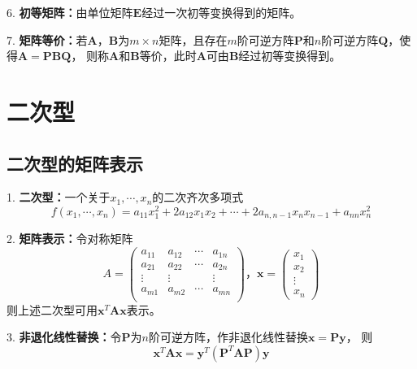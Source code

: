 6. \textbf{初等矩阵：}由单位矩阵$\boldsymbol{E}$经过一次初等变换得到的矩阵。

7. \textbf{矩阵等价：}若$\boldsymbol{A}$，$\boldsymbol{B}$为$m\times n$矩阵，且存在$m$阶可逆方阵$\boldsymbol{P}$和$n$阶可逆方阵$\boldsymbol{Q}$，使得$\boldsymbol{A}=\boldsymbol{P}\boldsymbol{B}\boldsymbol{Q}$，
则称$\boldsymbol{A}$和$\boldsymbol{B}$等价，此时$\boldsymbol{A}$可由$\boldsymbol{B}$经过初等变换得到。

\section{二次型}

\subsection{二次型的矩阵表示}

1. \textbf{二次型：}一个关于$x_1,\cdots,x_n$的二次齐次多项式
\begin{equation*}
    f(x_1,\cdots,x_n)=a_{11}x_1^2+2a_{12}x_1x_2+\cdots+2a_{n,n-1}x_nx_{n-1}+a_{nn}x_n^2
\end{equation*}

2. \textbf{矩阵表示：}令对称矩阵\begin{equation*}
    A=\begin{pmatrix}
        a_{11}&a_{12}&\cdots&a_{1n}\\
        a_{21}&a_{22}&\cdots&a_{2n}\\
        \vdots&\vdots&&\vdots\\
        a_{m1}&a_{m2}&\cdots&a_{mn}\\
    \end{pmatrix}\text{，}\boldsymbol{x}=\begin{pmatrix}
        x_1\\
        x_2\\
        \vdots\\
        x_n
    \end{pmatrix}
\end{equation*}
则上述二次型可用$\boldsymbol{x}^T\boldsymbol{A}\boldsymbol{x}$表示。

3. \textbf{非退化线性替换：}令$\boldsymbol{P}$为$n$阶可逆方阵，作非退化线性替换$\boldsymbol{x}=\boldsymbol{P}\boldsymbol{y}$，
则\begin{equation*}
    \boldsymbol{x}^T\boldsymbol{A}\boldsymbol{x}=\boldsymbol{y}^T(\boldsymbol{P}^T\boldsymbol{A}\boldsymbol{P})\boldsymbol{y}
\end{equation*}

